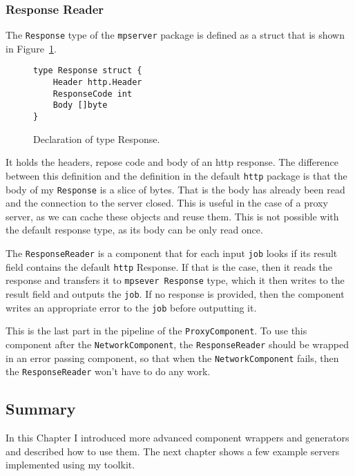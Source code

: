 \newpage
\subsubsection{Response Reader}
The \texttt{Response} type of the \texttt{mpserver} package is defined as
a struct that is shown in Figure~\ref{fig:Response}.
\begin{figure}[h]
\centering
\begin{lstlisting}
type Response struct {
    Header http.Header
    ResponseCode int
    Body []byte
}
\end{lstlisting}
\caption[scale=1.0]{Declaration of type Response.}
\label{fig:Response}
\end{figure}

It holds the headers, repose code and body of an http response. 
The difference between
this definition and the definition in the default \texttt{http} package is that
the body of my \texttt{Response} is a slice of bytes. 
That is the body has already been
read and the connection to the server closed. This is useful
in the case of a proxy server, as we can cache these objects and reuse
them. This is not possible with the default response type,
as its body can be only read once.

The \texttt{ResponseReader} is a component that for each input \texttt{job}
looks if its result field contains the default \texttt{http} Response. 
If that is the case,
then it reads the response and transfers it to \texttt{mpsever Response} 
type, which it
then writes to the result field and outputs the \texttt{job}. If no response
is provided, then the component writes an appropriate error to the
\texttt{job} before outputting it.

This is the last part in the pipeline of the \texttt{ProxyComponent}.
To use this component after the \texttt{NetworkComponent}, 
the \texttt{ResponseReader} should be wrapped in an error passing 
component, so that when the \texttt{Network\-Component} fails, then 
the \texttt{ResponseReader} won't have to do any work.


\subsection{Summary}
In this Chapter I introduced more advanced component wrappers and generators
and described how to use them. The next chapter shows a few example
servers implemented using my toolkit.

